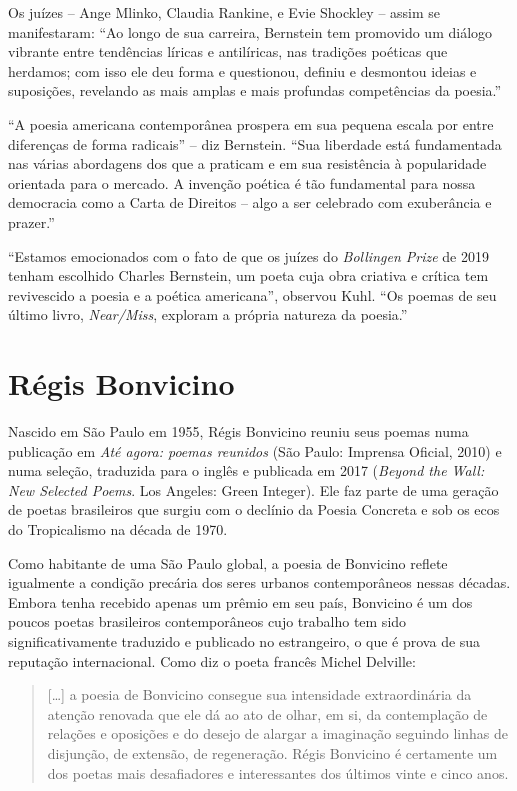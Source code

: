 Os juízes -- Ange Mlinko, Claudia Rankine, e Evie Shockley -- assim se
manifestaram: ``Ao longo de sua carreira, Bernstein tem promovido um
diálogo vibrante entre tendências líricas e antilíricas, nas tradições
poéticas que herdamos; com isso ele deu forma e questionou, definiu e
desmontou ideias e suposições, revelando as mais amplas e mais profundas
competências da poesia.''

``A poesia americana contemporânea prospera em sua pequena escala por
entre diferenças de forma radicais'' -- diz Bernstein. ``Sua liberdade
está fundamentada nas várias abordagens dos que a praticam e em sua
resistência à popularidade orientada para o mercado. A invenção poética
é tão fundamental para nossa democracia como a Carta de Direitos -- algo
a ser celebrado com exuberância e prazer.''

``Estamos emocionados com o fato de que os juízes do \emph{Bollingen
Prize} de 2019 tenham escolhido Charles Bernstein, um poeta cuja obra
criativa e crítica tem revivescido a poesia e a poética americana'',
observou Kuhl. ``Os poemas de seu último livro, \emph{Near/Miss},
exploram a própria natureza da poesia.''

\section{Régis Bonvicino}

Nascido em São Paulo em 1955, Régis Bonvicino reuniu seus poemas numa
publicação em \emph{Até agora: poemas reunidos} (São Paulo: Imprensa
Oficial, 2010) e numa seleção, traduzida para o inglês e publicada em
2017 (\emph{Beyond the Wall: New Selected Poems}. Los Angeles: Green
Integer). Ele faz parte de uma geração de poetas brasileiros que surgiu
com o declínio da Poesia Concreta e sob os ecos do Tropicalismo na
década de 1970.

Como habitante de uma São Paulo global, a poesia de Bonvicino reflete
igualmente a condição precária dos seres urbanos contemporâneos nessas
décadas. Embora tenha recebido apenas um prêmio em seu país, Bonvicino é
um dos poucos poetas brasileiros contemporâneos cujo trabalho tem sido
significativamente traduzido e publicado no estrangeiro, o que é prova
de sua reputação internacional. Como diz o poeta francês Michel
Delville:

\begin{quote}
{[}\ldots{}{]} a poesia de Bonvicino consegue sua intensidade
extraordinária da atenção renovada que ele dá ao ato de olhar, em si, da
contemplação de relações e oposições e do desejo de alargar a imaginação
seguindo linhas de disjunção, de extensão, de regeneração. Régis
Bonvicino é certamente um dos poetas mais desafiadores e interessantes
dos últimos vinte e cinco anos.
\end{quote}

